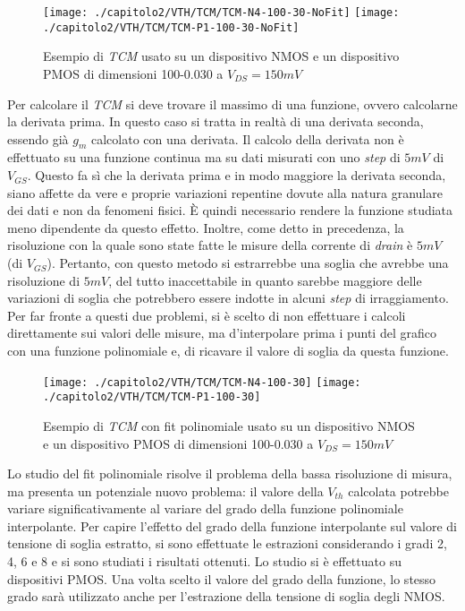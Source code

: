\begin{figure}[h!]
  \centering
  \texttt{[image: ./capitolo2/VTH/TCM/TCM-N4-100-30-NoFit]}
  \texttt{[image: ./capitolo2/VTH/TCM/TCM-P1-100-30-NoFit]}
  \caption[Applicazione TCM senza fit polinomiale]{Esempio di \emph{TCM} usato su un dispositivo NMOS e un dispositivo PMOS di dimensioni 100-0.030 a $V_{DS} = 150 mV$}
\end{figure}

Per calcolare il \emph{TCM} si deve trovare il massimo di una funzione, ovvero calcolarne la derivata prima. In questo caso si tratta in realtà di una derivata seconda, essendo già $g_m$ calcolato con una derivata. Il calcolo della derivata non è effettuato su una funzione continua ma su dati misurati con uno \emph{step} di $5mV$ di $V_{GS}$. Questo fa sì che la derivata prima e in modo maggiore la derivata seconda, siano affette da vere e proprie variazioni repentine dovute alla natura granulare dei dati e non da fenomeni fisici. È quindi necessario rendere la funzione studiata meno dipendente da questo effetto. Inoltre, come detto in precedenza, la risoluzione con la quale sono state fatte le misure della corrente di \emph{drain} è $5mV$ (di $V_{GS}$). Pertanto, con questo metodo si estrarrebbe una soglia che avrebbe una risoluzione di $5mV$, del tutto inaccettabile in quanto sarebbe maggiore delle variazioni di soglia che potrebbero essere indotte in alcuni \emph{step} di irraggiamento.
Per far fronte a questi due problemi, si è scelto di non effettuare i calcoli direttamente sui valori delle misure, ma d'interpolare prima i punti del grafico con una funzione polinomiale e, di ricavare il valore di soglia da questa funzione.

\begin{figure}[ht]
  \centering
  \texttt{[image: ./capitolo2/VTH/TCM/TCM-N4-100-30]}
  \texttt{[image: ./capitolo2/VTH/TCM/TCM-P1-100-30]}
  \caption[Applicazione TCM con fit polinomiale di sesto grado]{Esempio di \emph{TCM} con fit polinomiale usato su un dispositivo NMOS e un dispositivo PMOS di dimensioni 100-0.030 a $V_{DS} = 150 mV$}
\end{figure}

Lo studio del fit polinomiale risolve il problema della bassa risoluzione di misura, ma presenta un potenziale nuovo problema: il valore della $V_{th}$ calcolata potrebbe variare significativamente al variare del grado della funzione polinomiale interpolante. Per capire l'effetto del grado della funzione interpolante sul valore di tensione di soglia estratto, si sono effettuate le estrazioni considerando i gradi 2, 4, 6 e 8 e si sono studiati i risultati ottenuti. Lo studio si è effettuato su dispositivi PMOS. Una volta scelto il valore del grado della funzione, lo stesso grado sarà utilizzato anche per l'estrazione della tensione di soglia degli NMOS.

